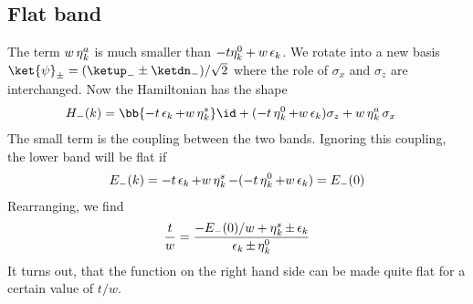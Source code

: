 

\subsection{Flat band}
The term $w \operatorname{\eta}^a_k$ is much smaller than $-t\eta_k^0+w \operatorname{\epsilon}_k$. We rotate into a new basis
$\ket{\psi}_\pm = (\ketup_- \pm \ketdn_-)/\sqrt{2}$ where the role of $\sigma_x$ and $\sigma_z$ are interchanged. Now the Hamiltonian has the shape
\begin{align}
    H_-(k) &= \bb{ -t \ep_k + w \et^{s}_k }\id +(-t \et^0_k + w \ep_k) \sigma_z +  w\et^{a}_k \sigma_x
\end{align}
The small term is the coupling between the two bands. Ignoring this coupling, the lower band will be flat if
\begin{align}
    E_-(k) = -t \operatorname{\epsilon}_k + w \operatorname{\eta}^s_k - (-t \operatorname{\eta}^0_k + w \operatorname{\epsilon}_k) = E_-(0)
\end{align}
Rearranging, we find
\begin{align}
    \frac{t}{w} = \frac{-E_-(0)/w + \operatorname{\eta}^s_k \pm \operatorname{\epsilon}_k}{\operatorname{\epsilon}_k \pm \operatorname{\eta}^0_k}
\end{align}
It turns out, that the function on the right hand side can be made quite flat for a certain value of $t/w$.


